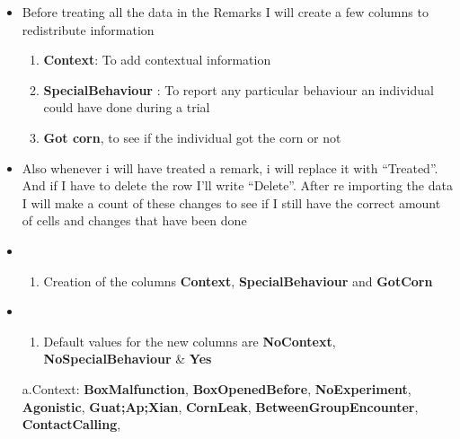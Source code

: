 \documentclass[
]{article}
\providecommand{\tightlist}{%
  \setlength{\itemsep}{0pt}\setlength{\parskip}{0pt}}
\begin{document}
\begin{itemize}
\item
  Before treating all the data in the Remarks I will create a few
  columns to redistribute information

  \begin{enumerate}
  \def\labelenumi{\arabic{enumi}.}
  \tightlist
  \item
    \textbf{Context}: To add contextual information
  \item
    \textbf{SpecialBehaviour} : To report any particular behaviour an
    individual could have done during a trial
  \item
    \textbf{Got corn}, to see if the individual got the corn or not
  \end{enumerate}
\item
  Also whenever i will have treated a remark, i will replace it with
  ``Treated''. And if I have to delete the row I'll write ``Delete''.
  After re importing the data I will make a count of these changes to
  see if I still have the correct amount of cells and changes that have
  been done
\item
  \begin{enumerate}
  \def\labelenumi{\arabic{enumi}.}
  \tightlist
  \item
    Creation of the columns \textbf{Context}, \textbf{SpecialBehaviour}
    and \textbf{GotCorn}
  \end{enumerate}
\item
  \begin{enumerate}
  \def\labelenumi{\arabic{enumi}.}
  \setcounter{enumi}{1}
  \tightlist
  \item
    Default values for the new columns are \textbf{NoContext},
    \textbf{NoSpecialBehaviour} \& \textbf{Yes}
  \end{enumerate}

  a.Context: \textbf{BoxMalfunction}, \textbf{BoxOpenedBefore},
  \textbf{NoExperiment}, \textbf{Agonistic}, \textbf{Guat;Ap;Xian},
  \textbf{CornLeak}, \textbf{BetweenGroupEncounter},
  \textbf{ContactCalling},


\end{itemize}
\end{document}

